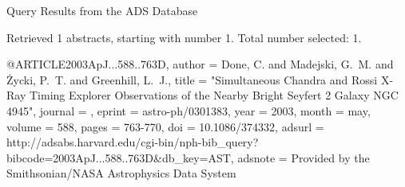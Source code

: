Query Results from the ADS Database


Retrieved 1 abstracts, starting with number 1.  Total number selected: 1.

@ARTICLE{2003ApJ...588..763D,
   author = {{Done}, C. and {Madejski}, G.~M. and {{\.Z}ycki}, P.~T. and 
	{Greenhill}, L.~J.},
    title = "{Simultaneous Chandra and Rossi X-Ray Timing Explorer Observations of the Nearby Bright Seyfert 2 Galaxy NGC 4945}",
  journal = {\apj},
   eprint = {astro-ph/0301383},
     year = 2003,
    month = may,
   volume = 588,
    pages = {763-770},
      doi = {10.1086/374332},
   adsurl = {http://adsabs.harvard.edu/cgi-bin/nph-bib_query?bibcode=2003ApJ...588..763D&db_key=AST},
  adsnote = {Provided by the Smithsonian/NASA Astrophysics Data System}
}


